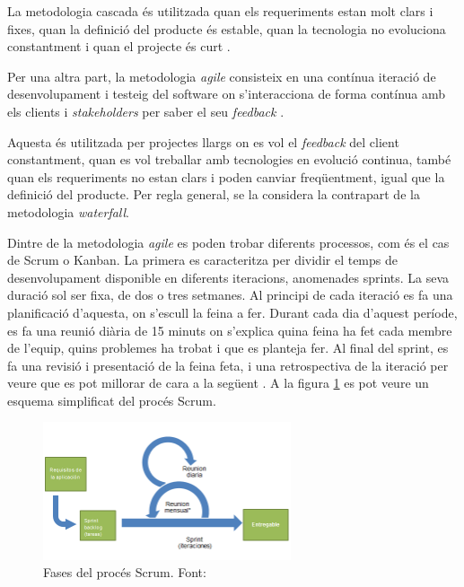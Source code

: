 \documentclass[a4paper]{article}
\begin{document}
La metodologia cascada és utilitzada quan els requeriments estan molt clars i fixes, quan la definició del producte és estable, quan la tecnologia no evoluciona constantment i quan el projecte és curt \cite{waterfallTutorialsPoint}.

Per una altra part, la metodologia \textit{agile} consisteix en una contínua iteració de desenvolupament i testeig del software on s'interacciona de forma contínua amb els clients i \textit{stakeholders} per saber el seu \textit{feedback} \cite{agileVsWaterfall}.

Aquesta és utilitzada per projectes llargs on es vol el \textit{feedback} del client constantment, quan es vol treballar amb tecnologies en evolució continua, també quan els requeriments no estan clars i poden canviar freqüentment, igual que la definició del producte. Per regla general, se la considera la contrapart de la metodologia \textit{waterfall}. 

Dintre de la metodologia \textit{agile} es poden trobar diferents processos, com és el cas de Scrum o Kanban. La primera es caracteritza per dividir el temps de desenvolupament disponible en diferents iteracions, anomenades sprints. La seva duració sol ser fixa,  de dos o tres setmanes. Al principi de cada iteració es fa una planificació d'aquesta, on s'escull la feina a fer. Durant cada dia d'aquest període, es fa una reunió diària de 15 minuts on s'explica quina feina ha fet cada membre de l'equip, quins problemes ha trobat i que es planteja fer. Al final del sprint, es fa una revisió i presentació de la feina feta, i una retrospectiva de la iteració per veure que es pot millorar de cara a la següent \cite{wikipediaScrum}. A la figura \ref{fig:ScrummImage} es pot veure un esquema simplificat del procés Scrum.

\begin{figure}[H]
    \centering
    \includegraphics[width=0.65\textwidth]{images/Scrumm.png}
    \caption{Fases del procés Scrum. Font: \cite{wikipediaScrum}}
    \label{fig:ScrummImage}
\end{figure}
\end{document}
